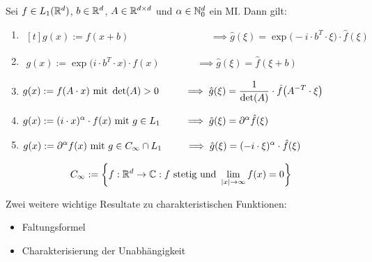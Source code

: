 \begin{korollar}\label{korollar6.3}
Sei $f\in L_1(\R^d)$, $b\in\R^d$, $A\in\R^{d\times d}$ und $\alpha\in\N_0^d$ ein MI. Dann gilt:
\begin{enumerate}[label=(\alph*)]
\item $\begin{aligned}[t]
g(x):=f(x+b) 
\hspace{100pt}\implies \hat{g}(\xi)=\exp\big(-i\cdot b^T\cdot\xi\big)\cdot\hat{f}(\xi)
\end{aligned}$
\item $\begin{aligned}
g(x):=\exp\big(i\cdot b^T\cdot x\big)\cdot f(x) 
\hspace{45pt}\implies \hat{g}(\xi)=\hat{f}(\xi+b)
\end{aligned}$
\item $\begin{aligned}
g(x):=f(A\cdot x)\mit \det(A)>0 
\hspace{24pt}\implies \hat{g}(\xi)=\frac{1}{\det(A)}\cdot\hat{f}\big(A^{-T}\cdot\xi\big)
\end{aligned}$
\item $\begin{aligned}
g(x):=(i\cdot x)^\alpha\cdot f(x)\mit g\in L_1 
\hspace{23pt}\implies \hat{g}(\xi)=\partial^\alpha\hat{f}(\xi)
\end{aligned}$
\item $\begin{aligned}
g(x):=\partial^\alpha f(x)\mit g\in C_\infty\cap L_1 
\hspace{22pt}\implies \hat{g}(\xi)=(-i\cdot\xi)^\alpha\cdot\hat{f}(\xi)
\end{aligned}$
\end{enumerate}
\end{korollar}

\begin{bemerkung}
\begin{align*}
C_\infty:=\left\lbrace f:\R^d\to\C:f\text{ stetig und }\lim\limits_{|x|\to\infty}f(x)=0\right\rbrace
\end{align*}
\end{bemerkung}

Zwei weitere wichtige Resultate zu charakteristischen Funktionen:
\begin{itemize}
\item Faltungsformel
\item Charakterisierung der Unabhängigkeit
\end{itemize}

